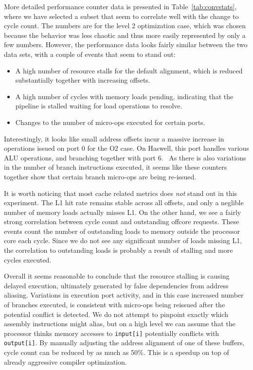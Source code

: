 \documentclass[prodmode,acmtaco]{acmsmall}
\begin{document}
{More detailed performance counter data is presented in Table~\ref{tab:convstats}, where we have selected a subset that seem to correlate well with the change to cycle count.
The numbers are for the level 2 optimization case, which was chosen because the behavior was less chaotic and thus more easily represented by only a few numbers.
However, the performance data looks fairly similar between the two data sets, with a couple of events that seem to stand out:
\begin{itemize}
    \item A high number of resource stalls for the default alignment, which is reduced substantially together with increasing offsets. 
    \item A high number of cycles with memory loads pending, indicating that the pipeline is stalled waiting for load operations to resolve.
    \item Changes to the number of micro-ops executed for certain ports.
\end{itemize}
Interestingly, it looks like small address offsets incur a massive increase in operations issued on port 0 for the O2 case. 
On Haswell, this port handles various ALU operations, and branching together with port 6.~\cite[Figure 2.1]{OptimizationManual}
As there is also variations in the number of branch instructions executed, it seems like these counters together show that certain branch micro-ops are being re-issued.

It is worth noticing that most cache related metrics does \emph{not} stand out in this experiment.
The L1 hit rate remains stable across all offsets, and only a neglible number of memory loads actually misses L1.
On the other hand, we see a fairly strong correlation between cycle count and outstanding offcore requests. 
These events count the number of outstanding loads to memory outside the processor core each cycle.
Since we do not see any significant number of loads missing L1, the correlation to outstanding loads is probably a result of stalling and more cycles executed.

Overall it seems reasonable to conclude that the resource stalling is causing delayed execution, ultimately generated by false dependencies from address aliasing.
Variations in execution port activity, and in this case increased number of branches executed, is consistent with micro-ops being reissued after the potential conflict is detected.
We do not attempt to pinpoint exactly which assembly instructions might alias, but on a high level we can assume that the processor thinks memory accesses to \texttt{input[i]} potentially conflicts with \texttt{output[i]}.
By manually adjusting the address alignment of one of these buffers, cycle count can be reduced by as much as 50\%.
This is a speedup on top of already aggressive compiler optimization.


}
\end{document}
